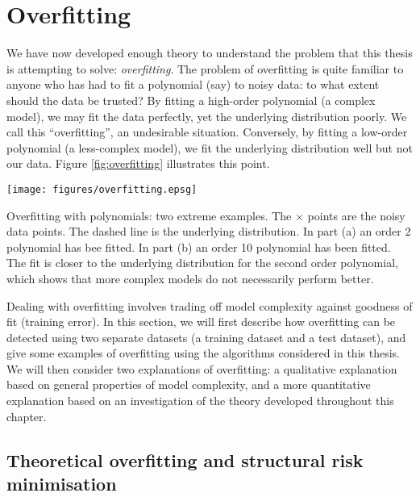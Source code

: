 \section{Overfitting}
\label{sec:overfitting}

We have now developed enough theory to understand the problem that
this thesis is attempting to solve: \emph{overfitting}.  The problem
of overfitting is quite familiar to anyone who has had to fit a
polynomial (say) to noisy data: to what extent should the data be
trusted?  By fitting a high-order polynomial (a complex model), we may
fit the data perfectly, yet the underlying distribution poorly.  We
call this ``overfitting'', an undesirable situation.  Conversely, by
fitting a low-order polynomial (a less-complex model), we fit the
underlying distribution well but not our data.  Figure
\ref{fig:overfitting} illustrates this point. 

\begin{linefigure}
\begin{center}
\texttt{[image: figures/overfitting.epsg]}
\end{center}
\begin{capt}{Overfitting with polynomials: two extreme examples.}
The $\times$ points are the noisy data points.  The dashed line is the
underlying distribution.  In part (a) an order 2 polynomial has bee
fitted.  In part (b) an order 10 polynomial has been fitted.  The fit
is closer to the underlying distribution for the second order
polynomial, which shows that more complex models do not necessarily
perform better.
\end{capt}
\label{fig:overfitting}
\end{linefigure}

Dealing with overfitting involves trading off model complexity against
goodness of fit (training error).  In this section, we will first
describe how overfitting can be detected using two separate datasets
(a training dataset and a test dataset), and give some examples of
overfitting using the algorithms considered in this thesis.  We will
then consider two explanations of overfitting: a qualitative
explanation based on general properties of model complexity, and a
more quantitative explanation based on an investigation of the theory
developed throughout this chapter.


\subsection{Theoretical overfitting and structural risk minimisation}
\label{sec:theoretical overfitting}
\label{acr:srm}

